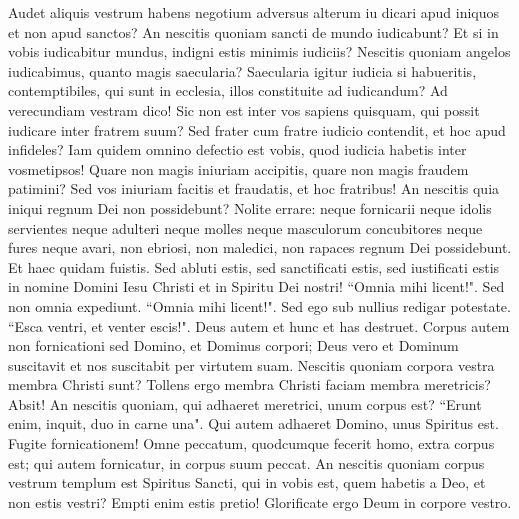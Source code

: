 \begin{biblechapter} 
\verse Audet aliquis vestrum habens negotium adversus alterum iu dicari apud iniquos et non apud sanctos? 
\verse An nescitis quoniam sancti de mundo iudicabunt? Et si in vobis iudicabitur mundus, indigni estis minimis iudiciis? 
\verse Nescitis quoniam angelos iudicabimus, quanto magis saecularia? 
\verse Saecularia igitur iudicia si habueritis, contemptibiles, qui sunt in ecclesia, illos constituite ad iudicandum? 
\verse Ad verecundiam vestram dico! Sic non est inter vos sapiens quisquam, qui possit iudicare inter fratrem suum? 
\verse Sed frater cum fratre iudicio contendit, et hoc apud infideles? 
\verse Iam quidem omnino defectio est vobis, quod iudicia habetis inter vosmetipsos! Quare non magis iniuriam accipitis, quare non magis fraudem patimini? 
\verse Sed vos iniuriam facitis et fraudatis, et hoc fratribus! 
\verse An nescitis quia iniqui regnum Dei non possidebunt? Nolite errare: neque fornicarii neque idolis servientes neque adulteri neque molles neque masculorum concubitores 
\verse neque fures neque avari, non ebriosi, non maledici, non rapaces regnum Dei possidebunt. 
\verse Et haec quidam fuistis. Sed abluti estis, sed sanctificati estis, sed iustificati estis in nomine Domini Iesu Christi et in Spiritu Dei nostri! 
\verse “Omnia mihi licent!". Sed non omnia expediunt. “Omnia mihi licent!". Sed ego sub nullius redigar potestate. 
\verse “Esca ventri, et venter escis!". Deus autem et hunc et has destruet. Corpus autem non fornicationi sed Domino, et Dominus corpori; 
\verse Deus vero et Dominum suscitavit et nos suscitabit per virtutem suam. 
\verse Nescitis quoniam corpora vestra membra Christi sunt? Tollens ergo membra Christi faciam membra meretricis? Absit! 
\verse An nescitis quoniam, qui adhaeret meretrici, unum corpus est? “Erunt enim, inquit, duo in carne una".  
\verse Qui autem adhaeret Domino, unus Spiritus est. 
\verse Fugite fornicationem! Omne peccatum, quodcumque fecerit homo, extra corpus est; qui autem fornicatur, in corpus suum peccat. 
\verse An nescitis quoniam corpus vestrum templum est Spiritus Sancti, qui in vobis est, quem habetis a Deo, et non estis vestri?  
\verse Empti enim estis pretio! Glorificate ergo Deum in corpore vestro. 
\end{biblechapter}

